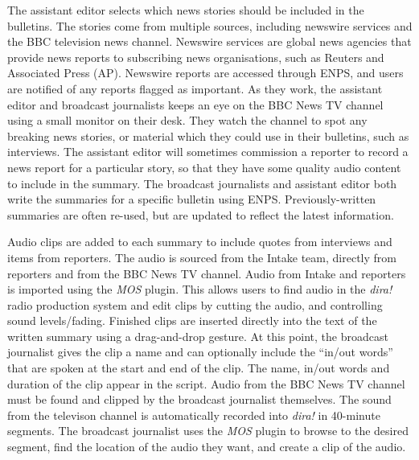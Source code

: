 The assistant editor selects which news stories should be included in the bulletins. The stories come from multiple
sources, including newswire services and the BBC television news channel.  Newswire services are global news agencies
that provide news reports to subscribing news organisations, such as Reuters and Associated Press (AP).  Newswire
reports are accessed through ENPS, and users are notified of any reports flagged as important.  As they work, the
assistant editor and broadcast journalists keeps an eye on the BBC News TV channel using a small monitor on their desk.
They watch the channel to spot any breaking news stories, or material which they could use in their bulletins, such as
interviews.  The assistant editor will sometimes commission a reporter to record a news report for a particular story,
so that they have some quality audio content to include in the summary. The broadcast journalists and assistant editor
both write the summaries for a specific bulletin using ENPS. Previously-written summaries are often re-used, but are
updated to reflect the latest information.

Audio clips are added to each summary to include quotes from interviews and items from reporters. The audio is sourced
from the Intake team, directly from reporters and from the BBC News TV channel. Audio from Intake and reporters is
imported using the \textit{MOS} plugin. This allows users to find audio in the \textit{dira!} radio production system
and edit clips by cutting the audio, and controlling sound levels/fading. Finished clips are inserted directly into the
text of the written summary using a drag-and-drop gesture. At this point, the broadcast journalist gives the clip a
name and can optionally include the ``in/out words'' that are spoken at the start and end of the clip.  The name,
in/out words and duration of the clip appear in the script.  Audio from the BBC News TV channel must be found and
clipped by the broadcast journalist themselves. The sound from the televison channel is automatically recorded into
\textit{dira!} in 40-minute segments. The broadcast journalist uses the \textit{MOS} plugin to browse to the desired
segment, find the location of the audio they want, and create a clip of the audio.


